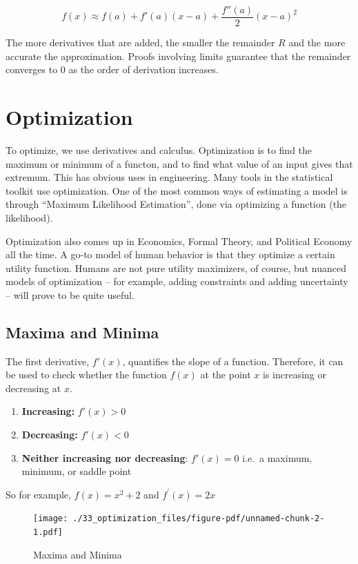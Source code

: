 \documentclass[
  letterpaper,
]{book}
\providecommand{\tightlist}{%
  \setlength{\itemsep}{0pt}\setlength{\parskip}{0pt}}\usepackage{longtable,booktabs,array}
\theoremstyle{definition}
\theoremstyle{definition}
\theoremstyle{plain}
\theoremstyle{definition}
\theoremstyle{plain}
\theoremstyle{plain}
\theoremstyle{remark}
\begin{document}
\[f(x) \approx f(a) + f'(a)(x-a) +  \dfrac{f''(a)}{2} (x-a)^2\]

The more derivatives that are added, the smaller the remainder \(R\) and
the more accurate the approximation. Proofs involving limits guarantee
that the remainder converges to 0 as the order of derivation increases.

\hypertarget{optim}{%
\chapter{Optimization}\label{optim}}

To optimize, we use derivatives and calculus. Optimization is to find
the maximum or minimum of a functon, and to find what value of an input
gives that extremum. This has obvious uses in engineering. Many tools in
the statistical toolkit use optimization. One of the most common ways of
estimating a model is through ``Maximum Likelihood Estimation'', done
via optimizing a function (the likelihood).

Optimization also comes up in Economics, Formal Theory, and Political
Economy all the time. A go-to model of human behavior is that they
optimize a certain utility function. Humans are not pure utility
maximizers, of course, but nuanced models of optimization -- for
example, adding constraints and adding uncertainty -- will prove to be
quite useful.

\hypertarget{maxima-and-minima}{%
\section{Maxima and Minima}\label{maxima-and-minima}}

The first derivative, \(f'(x)\), quantifies the slope of a function.
Therefore, it can be used to check whether the function \(f(x)\) at the
point \(x\) is increasing or decreasing at \(x\).

\begin{enumerate}
\def\labelenumi{\arabic{enumi}.}
\tightlist
\item
  \textbf{Increasing:} \(f'(x)>0\)
\item
  \textbf{Decreasing:} \(f'(x)<0\)
\item
  \textbf{Neither increasing nor decreasing}: \(f'(x)=0\) i.e.~a
  maximum, minimum, or saddle point
\end{enumerate}

So for example, \(f(x) = x^2 + 2\) and \(f^\prime(x) = 2x\)

\begin{figure}

{\centering \texttt{[image: ./33\_optimization\_files/figure-pdf/unnamed-chunk-2-1.pdf]}

}

\caption{Maxima and Minima}

\end{figure}
\end{document}
